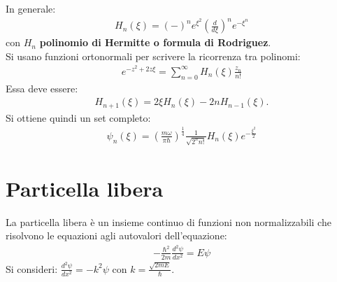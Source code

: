 In generale:
\begin{equation}\begin{split}
H_n\left(\xi\right)=\left(-\right)^ne^{\xi^2}\left(\frac{d}{d\xi}\right)^ne^{-\xi^n}
\end{split}\end{equation}
con $H_n$ \textbf{polinomio di Hermitte o formula di Rodriguez}. \\
Si usano funzioni ortonormali per scrivere la ricorrenza tra polinomi:
\begin{equation}\begin{split}
e^{-z^2+2z\xi}=\sum_{n=0}^{\infty}{H_n\left(\xi\right)\frac{z_n}{n!}}
\end{split}\end{equation}
Essa deve essere:
\begin{equation}\begin{split}
H_{n+1}\left(\xi\right)=2\xi H_n\left(\xi\right)-2nH_{n-1}\left(\xi\right).
\end{split}\end{equation}
Si ottiene quindi un set completo:
\begin{equation}\begin{split}
\psi _n\left(\xi\right)=\left(\frac{m\omega }{\pi \hbar }\right)^{\frac{1}{4}}\frac{1}{\sqrt{2^nn!}}H_n\left(\xi\right) e^{-\frac{\xi^2}{2}}
\end{split}\end{equation}

\section{Particella libera} %
La particella libera è un insieme continuo di funzioni non normalizzabili che risolvono le equazioni agli autovalori dell'equazione:
\begin{equation}\begin{split}
-\frac{\hbar ^2}{2m}\frac{d^2\psi }{dx^2}=E\psi 
\end{split}\end{equation}
Si consideri: $\frac{d^2\psi }{dx^2}=-k^2\psi $ con $k=\frac{\sqrt{2mE}}{\hbar }$.

